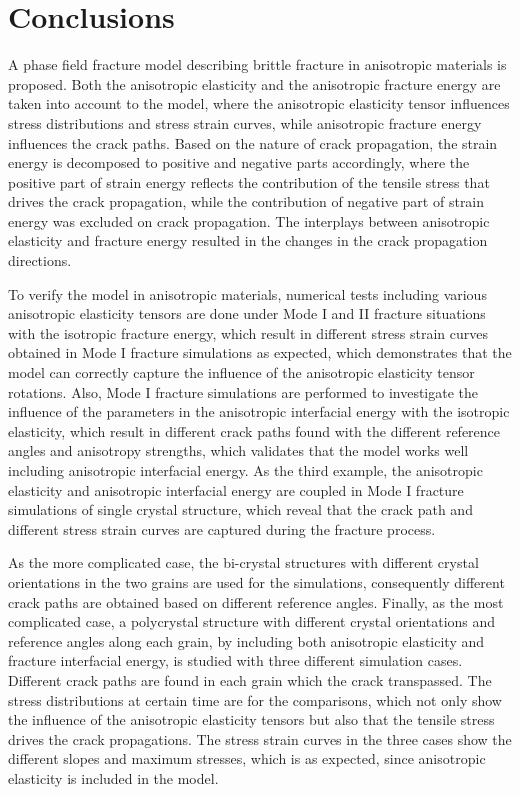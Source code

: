 \documentclass[3p,10pt,sort&compress]{elsarticle}
\begin{document}
\section{Conclusions}
A phase field fracture model describing brittle fracture in anisotropic materials is proposed. Both the anisotropic elasticity and the anisotropic fracture energy are taken into account to the model, where the anisotropic elasticity tensor influences stress distributions and stress strain curves, while anisotropic fracture energy influences the crack paths. Based on the nature of crack propagation, the strain energy is decomposed to positive and negative parts accordingly, where the positive part of strain energy reflects the contribution of the tensile stress that drives the crack propagation, while the contribution of negative part of strain energy was excluded on crack propagation. The interplays between anisotropic elasticity and fracture energy resulted in the changes in the crack propagation directions.

To verify the model in anisotropic materials, numerical tests including various anisotropic elasticity tensors are done under Mode I and II fracture situations with the isotropic fracture energy, which result in different stress strain curves obtained in Mode I fracture simulations as expected, which demonstrates that the model can correctly capture the influence of the anisotropic elasticity tensor rotations. Also, Mode I fracture simulations are performed to investigate the influence of the parameters in the anisotropic interfacial energy with the isotropic elasticity, which result in different crack paths found with the different reference angles and anisotropy strengths, which validates that the model works well including anisotropic interfacial energy. As the third example, the anisotropic elasticity and anisotropic interfacial energy are coupled in Mode I fracture simulations of single crystal structure, which reveal that the crack path and different stress strain curves are captured during the fracture process.

As the more complicated case, the bi-crystal structures with different crystal orientations in the two grains are used for the simulations, consequently different crack paths are obtained based on different reference angles. Finally, as the most complicated case, a polycrystal structure with different crystal orientations and reference angles along each grain, by including both anisotropic elasticity and fracture interfacial energy, is studied with three different simulation cases. Different crack paths are found in each grain which the crack transpassed. The stress distributions at certain time are for the comparisons, which not only show the influence of the anisotropic elasticity tensors but also that the tensile stress drives the crack propagations. The stress strain curves in the three cases show the different slopes and maximum stresses, which is as expected, since anisotropic elasticity is included in the model.
\end{document}

